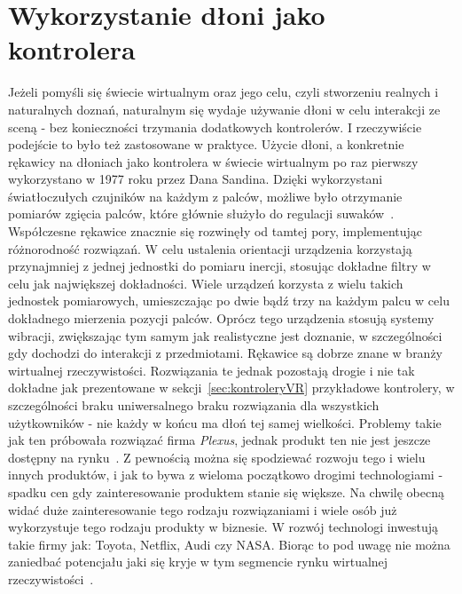 \section{Wykorzystanie dłoni jako kontrolera}
\label{sec:historia}
	Jeżeli pomyśli się świecie wirtualnym oraz jego celu, czyli stworzeniu realnych i naturalnych doznań, naturalnym się wydaje używanie dłoni w celu interakcji ze sceną - bez konieczności trzymania dodatkowych kontrolerów. I rzeczywiście podejście to było też zastosowane w praktyce. Użycie dłoni, a konkretnie rękawicy na dłoniach jako kontrolera w świecie wirtualnym po raz pierwszy wykorzystano w 1977 roku przez Dana Sandina. Dzięki wykorzystani światłoczułych czujników na każdym z palców, możliwe było otrzymanie pomiarów zgięcia palców, które głównie służyło do regulacji suwaków~\cite{sayreGlove}. Współczesne rękawice znacznie się rozwinęły od tamtej pory, implementując różnorodność rozwiązań. W celu ustalenia orientacji urządzenia korzystają przynajmniej z jednej jednostki do pomiaru inercji, stosując dokładne filtry w celu jak największej dokładności. Wiele urządzeń korzysta z wielu takich jednostek pomiarowych, umieszczając po dwie bądź trzy na każdym palcu w celu dokładnego mierzenia pozycji palców. Oprócz tego urządzenia stosują systemy wibracji, zwiększając tym samym jak realistyczne jest doznanie, w szczególności gdy dochodzi do interakcji z przedmiotami. Rękawice są dobrze znane w branży wirtualnej rzeczywistości. Rozwiązania te jednak pozostają drogie i nie tak dokładne jak prezentowane w sekcji~\ref{sec:kontroleryVR} przykładowe kontrolery, w szczególności braku uniwersalnego braku rozwiązania dla wszystkich użytkowników - nie każdy w końcu ma dłoń tej samej wielkości. Problemy takie jak ten próbowała rozwiązać firma \textit{Plexus}, jednak produkt ten nie jest jeszcze dostępny na rynku~\cite{plexus}. Z pewnością można się spodziewać rozwoju tego i wielu innych produktów, i jak to bywa z wieloma początkowo drogimi technologiami - spadku cen gdy zainteresowanie produktem stanie się większe. Na chwilę obecną widać duże zainteresowanie tego rodzaju rozwiązaniami i wiele osób już wykorzystuje tego rodzaju produkty w biznesie. W rozwój technologi inwestują takie firmy jak: Toyota, Netflix, Audi czy NASA. Biorąc to pod uwagę nie można zaniedbać potencjału jaki się kryje w tym segmencie rynku wirtualnej rzeczywistości~\cite{manus}.
	
	
	
	
	
	
	
	
	
	
	
	
	
	
	
	
	
	
	
	
